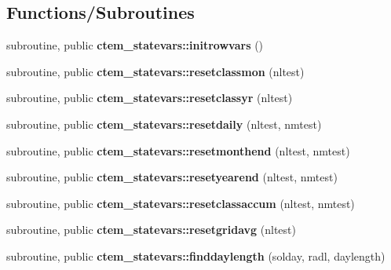 \subsection*{Functions/\+Subroutines}
\begin{DoxyCompactItemize}
\item 
\hypertarget{namespacectem__statevars_a069aa6fb4b132ef4fe61febb61d40ec1}{}subroutine, public {\bfseries ctem\+\_\+statevars\+::initrowvars} ()\label{namespacectem__statevars_a069aa6fb4b132ef4fe61febb61d40ec1}

\item 
\hypertarget{namespacectem__statevars_ae0b072c8e351526245a583646e778fe6}{}subroutine, public {\bfseries ctem\+\_\+statevars\+::resetclassmon} (nltest)\label{namespacectem__statevars_ae0b072c8e351526245a583646e778fe6}

\item 
\hypertarget{namespacectem__statevars_aeba858367dfd67125a0f77f94496d163}{}subroutine, public {\bfseries ctem\+\_\+statevars\+::resetclassyr} (nltest)\label{namespacectem__statevars_aeba858367dfd67125a0f77f94496d163}

\item 
\hypertarget{namespacectem__statevars_af1d0ff0bbf816233f2b51362f1ccb523}{}subroutine, public {\bfseries ctem\+\_\+statevars\+::resetdaily} (nltest, nmtest)\label{namespacectem__statevars_af1d0ff0bbf816233f2b51362f1ccb523}

\item 
\hypertarget{namespacectem__statevars_afcc1311f7dd0743cf4002b0d2635e824}{}subroutine, public {\bfseries ctem\+\_\+statevars\+::resetmonthend} (nltest, nmtest)\label{namespacectem__statevars_afcc1311f7dd0743cf4002b0d2635e824}

\item 
\hypertarget{namespacectem__statevars_a090f13e5df0ad3551010689fcf82a0ac}{}subroutine, public {\bfseries ctem\+\_\+statevars\+::resetyearend} (nltest, nmtest)\label{namespacectem__statevars_a090f13e5df0ad3551010689fcf82a0ac}

\item 
\hypertarget{namespacectem__statevars_ac5b2a6004c5c8f833b1ec04ef0d8674f}{}subroutine, public {\bfseries ctem\+\_\+statevars\+::resetclassaccum} (nltest, nmtest)\label{namespacectem__statevars_ac5b2a6004c5c8f833b1ec04ef0d8674f}

\item 
\hypertarget{namespacectem__statevars_a424132cbb7cede85302f098c104b6b81}{}subroutine, public {\bfseries ctem\+\_\+statevars\+::resetgridavg} (nltest)\label{namespacectem__statevars_a424132cbb7cede85302f098c104b6b81}

\item 
\hypertarget{namespacectem__statevars_ad9e9f0c26eb20456932853a6fc897631}{}subroutine, public {\bfseries ctem\+\_\+statevars\+::finddaylength} (solday, radl, daylength)\label{namespacectem__statevars_ad9e9f0c26eb20456932853a6fc897631}

\end{DoxyCompactItemize}
